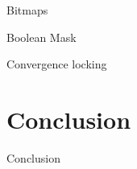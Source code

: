 \documentclass{beamer}
\begin{document}
\begin{frame}{Bitmaps}
\end{frame}

\begin{frame}{Boolean Mask}
\end{frame}

\begin{frame}{Convergence locking}
\end{frame}

\section{Conclusion}

\begin{frame}{Conclusion}
\end{frame}

\begin{frame}
\titlepage
\end{frame}
\end{document}
